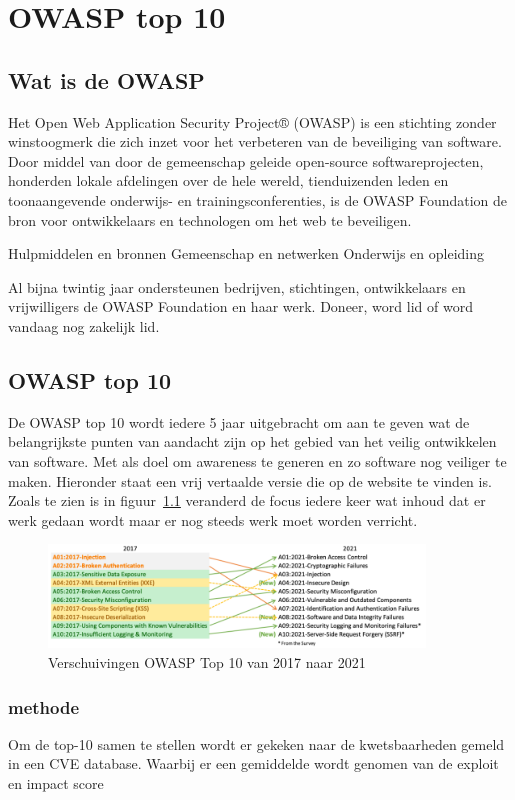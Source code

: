 
\chapter{OWASP top 10}\label{ch:owasp-top-10}
\section{Wat is de OWASP}
Het Open Web Application Security Project® (OWASP) is een stichting zonder winstoogmerk die zich inzet voor het verbeteren van de beveiliging van software. Door middel van door de gemeenschap geleide open-source softwareprojecten, honderden lokale afdelingen over de hele wereld, tienduizenden leden en toonaangevende onderwijs- en trainingsconferenties, is de OWASP Foundation de bron voor ontwikkelaars en technologen om het web te beveiligen.

Hulpmiddelen en bronnen
Gemeenschap en netwerken
Onderwijs en opleiding

Al bijna twintig jaar ondersteunen bedrijven, stichtingen, ontwikkelaars en vrijwilligers de OWASP Foundation en haar werk. Doneer, word lid of word vandaag nog zakelijk lid.

\section{OWASP top 10}\label{sec:owasp-top-10}
De OWASP top 10 wordt iedere 5 jaar uitgebracht om aan te geven wat de belangrijkste punten van aandacht zijn op het gebied van het veilig ontwikkelen van software. Met als doel om awareness te generen en zo software nog veiliger te maken. Hieronder staat een vrij vertaalde versie die op de website te vinden is. Zoals te zien is in figuur~\ref{fig:OWASPTop10Shifts} veranderd de focus iedere keer wat inhoud dat er werk gedaan wordt maar er nog steeds werk moet worden verricht.
\begin{figure}[bth]
    \myfloatalign
    \includegraphics[width=10cm]{gfx/OWASPTop10 2017 to 2021}
    \caption{Verschuivingen OWASP Top 10 van 2017 naar 2021}
    \label{fig:OWASPTop10Shifts}
\end{figure}
\subsection{methode}
Om de top-10 samen te stellen wordt er gekeken naar de kwetsbaarheden gemeld in een CVE database. Waarbij er een gemiddelde wordt genomen van de exploit en impact score

